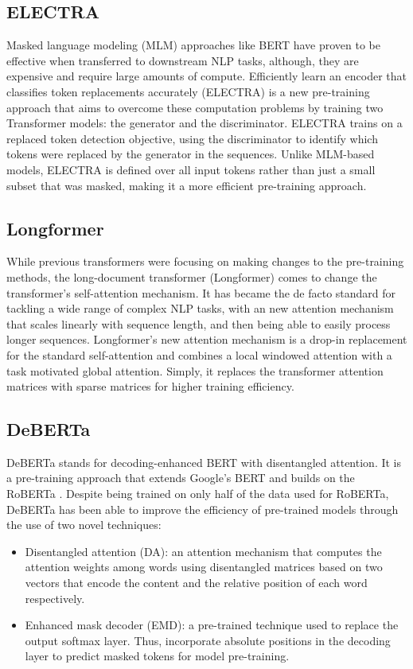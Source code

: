 \documentclass{article}
\begin{document}
\subsection{ELECTRA}
Masked language modeling (MLM) approaches like BERT \cite{devlin2018bert} have proven to be effective when transferred to downstream NLP tasks, although, they are expensive and require large amounts of compute. Efficiently learn an encoder that classifies token replacements accurately (ELECTRA) \cite{clark2020electra} is a new pre-training approach that aims to overcome these computation problems by training two Transformer models: the generator and the discriminator. ELECTRA trains on a replaced token detection objective, using the discriminator to identify which tokens were replaced by the generator in the sequences. Unlike MLM-based models, ELECTRA is defined over all input tokens rather than just a small subset that was masked, making it a more efficient pre-training approach.

\subsection{Longformer}
While previous transformers were focusing on making changes to the pre-training methods, the long-document transformer (Longformer) \cite{beltagy2020longformer} comes to change the transformer's self-attention mechanism. It has became the de facto standard for tackling a wide range of complex NLP tasks, with an new attention mechanism that scales linearly with sequence length, and then being able to easily process longer sequences. Longformer's new attention mechanism is a drop-in replacement for the standard self-attention and combines a local windowed attention with a task motivated global attention. Simply, it replaces the transformer \cite{vaswani2017attention} attention matrices with sparse matrices for higher training efficiency.

\subsection{DeBERTa}
DeBERTa \cite{he2020deberta} stands for decoding-enhanced BERT with disentangled attention. It is a pre-training approach that extends Google’s BERT \cite{devlin2018bert} and builds on the RoBERTa \cite{liu2019roberta}. Despite being trained on only half of the data used for RoBERTa, DeBERTa has been able to improve the efficiency of pre-trained models through the use of two novel techniques:
\begin{itemize}
  \item Disentangled attention (DA): an attention mechanism that computes the attention weights among words using disentangled matrices based on two vectors that encode the content and the relative position of each word respectively.
  \item Enhanced mask decoder (EMD): a pre-trained technique used to replace the output softmax layer. Thus, incorporate absolute positions in the decoding layer to predict masked tokens for model pre-training.
\end{itemize}
\end{document}

